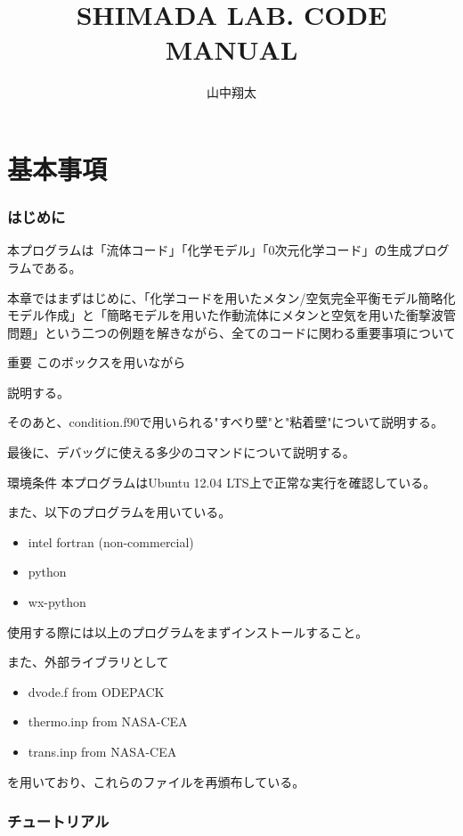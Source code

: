 \documentclass{jsarticle}
\begin{document}
\title{SHIMADA LAB. CODE\\MANUAL}
\author{山中翔太}%
\maketitle
\newpage
\tableofcontents
\newpage

\part{基本事項}
\newpage
\section{はじめに}%
本プログラムは「流体コード」「化学モデル」「0次元化学コード」の生成プログラムである。

本章ではまずはじめに、「化学コードを用いたメタン/空気完全平衡モデル簡略化モデル作成」と「簡略モデルを用いた作動流体にメタンと空気を用いた衝撃波管問題」という二つの例題を解きながら、全てのコードに関わる重要事項について
\begin{itembox}[l]{重要}
このボックスを用いながら
\end{itembox}
説明する。

そのあと、condition.f90で用いられる"すべり壁"と"粘着壁"について説明する。

最後に、デバッグに使える多少のコマンドについて説明する。

\begin{itembox}[l]{環境条件}
本プログラムはUbuntu 12.04 LTS上で正常な実行を確認している。

また、以下のプログラムを用いている。
\begin{itemize}
\item intel fortran (non-commercial)
\item python
\item wx-python
\end{itemize}
使用する際には以上のプログラムをまずインストールすること。

また、外部ライブラリとして
\begin{itemize}
\item dvode.f from ODEPACK
\item thermo.inp from NASA-CEA
\item trans.inp from NASA-CEA
\end{itemize}
を用いており、これらのファイルを再頒布している。
\end{itembox}

\newpage
\section{チュートリアル}%
\end{document}
